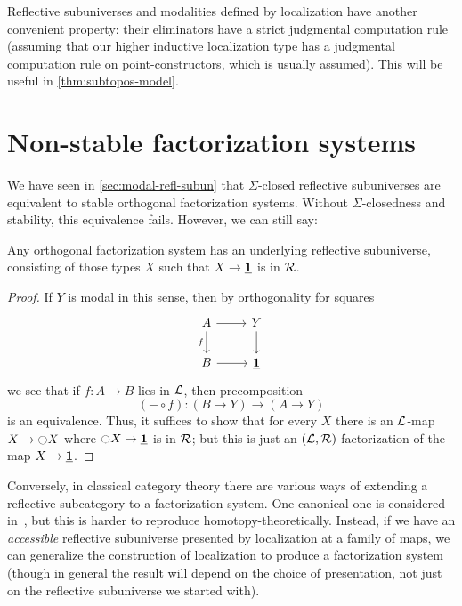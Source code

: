\begin{rmk}
  Reflective subuniverses and modalities defined by localization have another convenient property: their eliminators have a strict judgmental computation rule (assuming that our higher inductive localization type has a judgmental computation rule on point-constructors, which is usually assumed).
  This will be useful in \cref{thm:subtopos-model}.
\end{rmk}


\section{Non-stable factorization systems}
\label{sec:nonstable-factsys}

We have seen in \cref{sec:modal-refl-subun} that $\Sigma$-closed reflective subuniverses are equivalent to stable orthogonal factorization systems.
Without $\Sigma$-closedness and stability, this equivalence fails.
However, we can still say:

\begin{lem}
  Any orthogonal factorization system has an underlying reflective subuniverse, consisting of those types $X$ such that $X\to\underline{\mathbf{1}}$ is in $\mathcal{R}$.
\end{lem}
\begin{proof}
  If $Y$ is modal in this sense, then by orthogonality for squares
  \[
  \begin{tikzcd}
    A \ar[d,"f"'] \ar[r] & Y \ar[d] \\ B \ar[r] & \unit
  \end{tikzcd}
  \]
  we see that if $f:A\to B$ lies in $\mathcal{L}$, then precomposition
  \[ (-\circ f) : (B\to Y) \to (A\to Y) \]
  is an equivalence.
  Thus, it suffices to show that for every $X$ there is an $\mathcal{L}$-map $X\to {\ensuremath{\ocircle}} X$ where ${\ocircle} X\to \underline{\mathbf{1}}$ is in $\mathcal{R}$; but this is just an $(\mathcal{L},\mathcal{R})$-factorization of the map $X\to\underline{\mathbf{1}}$.
\end{proof}

Conversely, in classical category theory there are various ways of extending a reflective subcategory to a factorization system.
One canonical one is considered in~\cite{chk:reflocfact}, but this is harder to reproduce homotopy-theoretically.
Instead, if we have an \emph{accessible} reflective subuniverse presented by localization at a family of maps, we can generalize the construction of localization to produce a factorization system (though in general the result will depend on the choice of presentation, not just on the reflective subuniverse we started with).


